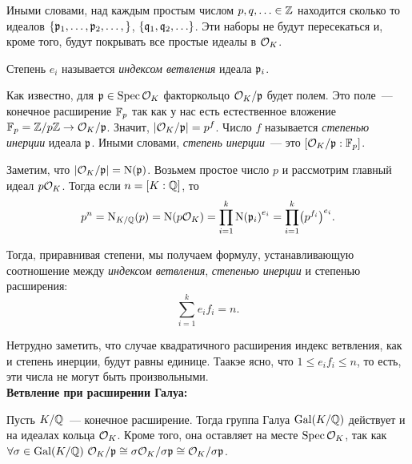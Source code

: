 	Иными словами, над каждым простым числом $p, q, \ldots \in \mathbb{Z}$ находится сколько то идеалов $\{ \mathfrak{p}_{1}, \ldots, \mathfrak{p}_{2}, \ldots, \}$,  $\{ \mathfrak{q}_{1}, \mathfrak{q}_{2}, \ldots\}$. Эти наборы не будут пересекаться и, кроме того, будут покрывать все простые идеалы в $\mathcal{O}_{K}$.
	\begin{definition} 
		Степень $e_i$ называется \emph{индексом ветвления} идеала $\mathfrak{p}_{i}$.
	\end{definition}

	\begin{definition} 
		Как известно, для $\mathfrak{p} \in \operatorname{Spec}{\mathcal{O}_{K}}$ факторкольцо $\mathcal{O}_{K}/\mathfrak{p}$ будет полем. Это поле~--- конечное расширение $\mathbb{F}_{p}$ так как у нас есть естественное вложение $\mathbb{F}_{p}  = \mathbb{Z}/p\mathbb{Z} \to \mathcal{O}_{K}/\mathfrak{p}$. Значит, $\left\lvert \mathcal{O}_{K}/\mathfrak{p} \right\rvert = p^{f}$. Число $f$ называется \emph{степенью инерции} идеала $\mathfrak{p}$. Иными словами, \emph{степень инерции}~--- это $[\mathcal{O}_{K}/\mathfrak{p} : \mathbb{F}_{p}]$.
	\end{definition}

	Заметим, что $|\mathcal{O}_{K}/\mathfrak{p}| = \operatorname{\mathrm{N}}(\mathfrak{p})$. Возьмем простое число $p$ и рассмотрим главный идеал $p\mathcal{O}_{K}$. Тогда  если $n = [K : \mathbb{Q}]$, то
	\[
		p^n = \Nm_{K/\Q}(p) = \Nm\lr*{p\cO_{K}} = \prod_{i = 1}^{k} \Nm\lr*{\fp_{i}}^{e_{i}} = \prod_{i = 1}^{k} \lr*{p^{f_{i}}}^{e_i}.
	\]

	Тогда, приравнивая степени, мы получаем формулу, устанавливающую соотношение между \emph{индексом ветвления}, \emph{степенью инерции} и степенью расширения: 
	\begin{equation}
		\sum\limits_{i = 1}^{k} e_i f_i = n. \label{deg_ind_eq}
	\end{equation}

	Нетрудно заметить, что случае квадратичного расширения индекс ветвления, как и степень инерции, будут равны единице.  Таакэе ясно, что $1 \le e_{i} f_{i} \le n$, то есть, эти числа не могут быть произвольными. \\

	\noindent\bf{Ветвление при расширении Галуа:}

	Пусть $K/\mathbb{Q}$~--- конечное расширение. Тогда группа Галуа $\operatorname{Gal}(K/\mathbb{Q})$ действует и на идеалах кольца $\mathcal{O}_{K}$. Кроме того, она оставляет на месте $\operatorname{Spec}{\mathcal{O}_{K}}$, так как $ \forall \sigma \in \operatorname{Gal}(K/\mathbb{Q}) \ \mathcal{O}_{K}/\mathfrak{p} \cong \sigma\mathcal{O}_{K}/\sigma \mathfrak{p} \cong \mathcal{O}_{K}/\sigma \mathfrak{p}$. 

